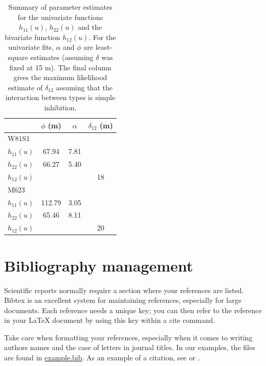 \documentclass{article}
\newcommand*{\micro}{\textmu}
\providecommand*{\latex}{\LaTeX\xspace}
\begin{document}
\begin{table}[htbp]
  \centering
  \begin{tabular}{lccc}                                                          \\ \hline
                & \multicolumn{1}{c}{$\phi$ (\micro m)}
                & \multicolumn{1}{c}{$\alpha$}
                & $\delta_{12}$ (\micro m)                          \\ \hline
    W81S1                                                           \\
    $h_{11}(u)$ & 67.94                                 & 7.81      \\
    $h_{22}(u)$ & 66.27                                 & 5.40      \\
    $h_{12}(u)$ &                                       &      & 18 \\
    \hline
    M623                                                            \\
    $h_{11}(u)$ & 112.79                                & 3.05      \\
    $h_{22}(u)$ & 65.46                                 & 8.11      \\
    $h_{12}(u)$ &                                       &      & 20 \\
    \hline
  \end{tabular}
  \caption{Summary of parameter estimates for the univariate
    functions $h_{11}(u)$, $h_{22}(u)$ and the bivariate function
    $h_{12}(u)$.  For the univariate fits, $\alpha$ and $\phi$ are
    least-square estimates (assuming $\delta$ was fixed at 15 \micro m).
    The final column gives the
    maximum likelihood estimate of $\delta_{12}$ assuming that the
    interaction between types is simple inhibition.
    \label{tab:pars}}
\end{table}


\section{Bibliography management}

Scientific reports normally require a section where your references
are listed.  Bibtex is an excellent system for maintaining references,
especially for large documents.  Each reference needs a unique key;
you can then refer to the reference in your \latex document by using
this key within a cite command.

Take care when formatting your references, especially when it comes to
writing authors names and the case of letters in journal titles.  In
our examples, the files are found in \url{example.bib}.  As an example
of a citation, see \citep{ihaka1996} or \citep{ihaka1996,venables1999}.
\end{document}
